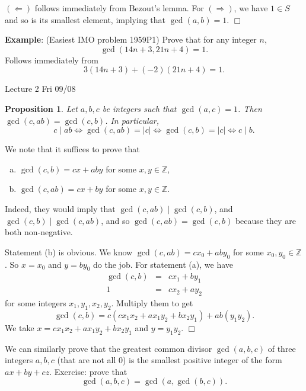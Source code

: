 \documentclass{article}
\def\Z{{\mathbb Z}}
\def\Z{{\mathbb Z}}
\newtheorem{proposition}[subsection]{Proposition}
\newenvironment{proof}{\noindent {\bf Proof:}}{$\Box$ \vspace{2 ex}}
\newcommand{\add}[1]{{\color{blue} #1}}
\begin{document}
\begin{proof}
    $(\Leftarrow)$ follows immediately from Bezout's lemma. For $(\Rightarrow)$, we have $1\in S$ and so is its smallest element, implying that $\gcd(a,b) = 1$.
\end{proof}

\noindent\textbf{Example}: (Easiest IMO problem 1959P1) Prove that for any integer $n$, $$\gcd(14n+3, 21n+4) = 1.$$
Follows immediately from $$3(14n+3) + (-2)(21n+4) = 1.$$

\begin{center}
    \add{Lecture 2 Fri 09/08}
\end{center}


\begin{proposition}\label{prop:CAD}
    Let $a,b,c$ be integers such that $\gcd(a,c) = 1$. Then $\gcd(c, ab) = \gcd(c, b)$. In particular, $$c\mid ab \Longleftrightarrow \gcd(c,ab) = |c|\Longleftrightarrow\gcd(c,b) = |c|\Longleftrightarrow c\mid b.$$
\end{proposition}

\begin{proof}
    We note that it suffices to prove that 
    \begin{enumerate}[(a)]
        \item $\gcd(c,b) = cx + aby$ for some $x,y\in\Z$,
        \item $\gcd(c, ab) = cx + by$ for some $x,y\in\Z$.
    \end{enumerate}
    Indeed, they would imply that $\gcd(c,ab)\mid\gcd(c,b)$, and $\gcd(c,b)\mid\gcd(c,ab)$, and so $\gcd(c, ab) = \gcd(c, b)$ because they are both non-negative.

    Statement (b) is obvious. We know $\gcd(c,ab) = cx_0 + aby_0$ for some $x_0,y_0\in\Z$. So $x = x_0$ and $y = by_0$ do the job. For statement (a), we have
    \begin{eqnarray*}
        \gcd(c,b) &=& cx_1 + by_1\\
        1 &=& cx_2 + ay_2
    \end{eqnarray*}
    for some integers $x_1,y_1,x_2,y_2$. Multiply them to get
    $$\gcd(c,b) = c(cx_1x_2 + ax_1y_2+bx_2y_1) + ab(y_1y_2).$$
    We take $x = cx_1x_2 + ax_1y_2+bx_2y_1$ and $y = y_1y_2$.
\end{proof}

We can similarly prove that the greatest common divisor $\gcd(a,b,c)$ of three integers $a,b,c$ (that are not all $0$) is the smallest positive integer of the form $ax + by + cz$. Exercise: prove that
$$\gcd(a,b,c) = \gcd(a,\gcd(b,c)).$$
\end{document}
